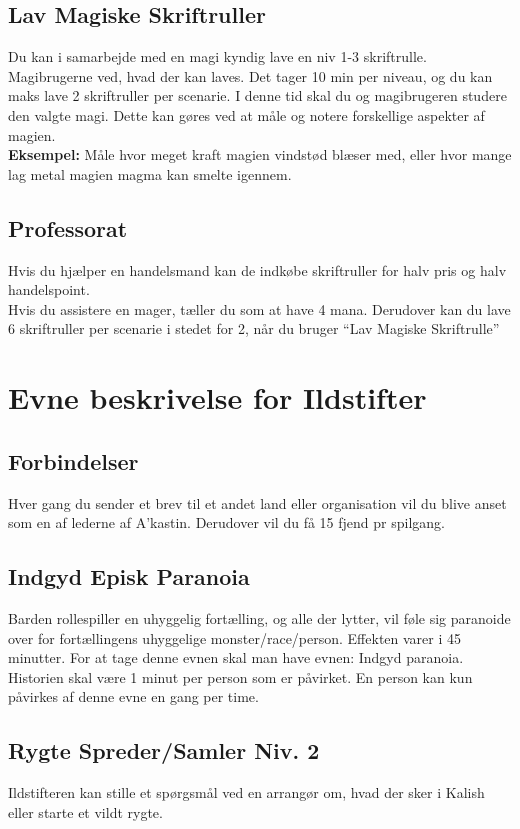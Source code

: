 \subsection*{Lav Magiske Skriftruller}
Du kan i samarbejde med en magi kyndig lave en niv 1-3 skriftrulle. Magibrugerne ved, hvad der kan laves. Det tager 10 min per niveau, og du kan maks lave 2 skriftruller per scenarie. I denne tid skal du og magibrugeren studere den valgte magi. Dette kan gøres ved at måle og notere forskellige aspekter af magien.\\ \textbf{Eksempel:} Måle hvor meget kraft magien vindstød blæser med, eller hvor mange lag metal magien magma kan smelte igennem.

\subsection*{Professorat}
Hvis du hjælper en handelsmand kan de indkøbe skriftruller for halv pris og halv handelspoint.\\
Hvis du assistere en mager, tæller du som at have 4 mana.
Derudover kan du lave 6 skriftruller per scenarie i stedet for 2, når du bruger “Lav Magiske Skriftrulle”


\section*{Evne beskrivelse for Ildstifter}

\subsection*{Forbindelser}
Hver gang du sender et brev til et andet land eller organisation vil du blive anset
som en af lederne af A’kastin. Derudover vil du få 15 fjend pr spilgang.


\subsection*{Indgyd Episk Paranoia}
Barden rollespiller en uhyggelig fortælling,
og alle der lytter, vil føle sig paranoide
over for fortællingens uhyggelige
monster/race/person. Effekten varer i 45 minutter. For at tage denne evnen skal man have evnen: Indgyd paranoia. Historien skal være 1 minut per person som er påvirket. En person kan kun påvirkes af denne evne en gang per time.

\subsection*{Rygte Spreder/Samler Niv. 2}
Ildstifteren kan stille et spørgsmål ved en arrangør om, hvad der sker i Kalish eller starte et vildt rygte.
